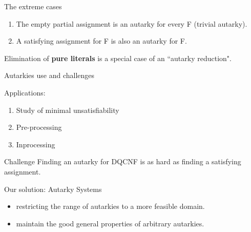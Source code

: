 \documentclass[xcolor=table	]{beamer}
\begin{document}
\begin{frame}{The extreme cases}

\begin{enumerate}
	\item The empty partial assignment is an autarky for every F \newline (trivial autarky).
	
	\item A satisfying assignment for F is also an autarky for F. \newline
\end{enumerate}
\pause 
\vspace{0.5cm}
Elimination of \textbf{pure literals} is a special case of an ``autarky reduction".


\end{frame}


\begin{frame}{Autarkies use and challenges}

Applications: 
\begin{enumerate}
    \item Study of minimal unsatisfiability~\cite{buning2009minimal}
    \item Pre-processing 
    \item Inprocessing
\end{enumerate}

 \begin{exampleblock}{Challenge}
 Finding an autarky for DQCNF is as hard as finding a satisfying assignment.
\end{exampleblock}
    \pause 
  \begin{alertblock}{Our solution: Autarky Systems}
  \begin{itemize}
      \item restricting the range of autarkies to a more feasible domain.
      \item maintain the good general properties of arbitrary autarkies.
  \end{itemize}
 
  \end{alertblock}

\end{frame}
\end{document}
